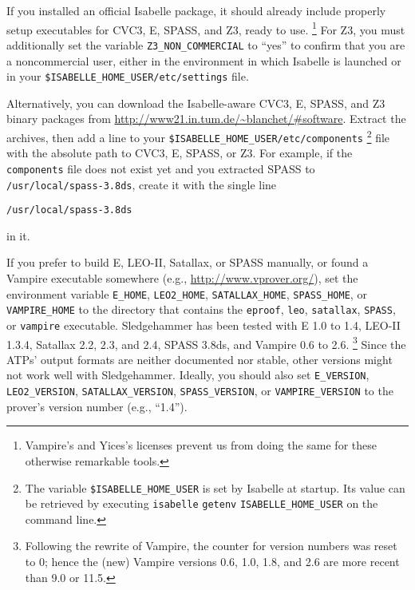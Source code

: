 \documentclass[a4paper,12pt]{article}
\newcommand\download{\url{http://www21.in.tum.de/~blanchet/\#software}}
\begin{document}
\begin{sloppy}
\begin{enum}
\item[\labelitemi] If you installed an official Isabelle package, it should
already include properly setup executables for CVC3, E, SPASS, and Z3, ready to use.%
\footnote{Vampire's and Yices's licenses prevent us from doing the same for
these otherwise remarkable tools.}
For Z3, you must additionally set the variable
\texttt{Z3\_NON\_COMMERCIAL} to ``yes'' to confirm that you are a
noncommercial user, either in the environment in which Isabelle is
launched or in your
\texttt{\$ISABELLE\_HOME\_USER/etc/settings} file.

\item[\labelitemi] Alternatively, you can download the Isabelle-aware CVC3, E,
SPASS, and Z3 binary packages from \download. Extract the archives, then add a
line to your \texttt{\$ISABELLE\_HOME\_USER\slash etc\slash components}%
\footnote{The variable \texttt{\$ISABELLE\_HOME\_USER} is set by Isabelle at
startup. Its value can be retrieved by executing \texttt{isabelle}
\texttt{getenv} \texttt{ISABELLE\_HOME\_USER} on the command line.}
file with the absolute path to CVC3, E, SPASS, or Z3. For example, if the
\texttt{components} file does not exist yet and you extracted SPASS to
\texttt{/usr/local/spass-3.8ds}, create it with the single line

\prew
\texttt{/usr/local/spass-3.8ds}
\postw

in it.

\item[\labelitemi] If you prefer to build E, LEO-II, Satallax, or SPASS
manually, or found a Vampire executable somewhere (e.g.,
\url{http://www.vprover.org/}), set the environment variable \texttt{E\_HOME},
\texttt{LEO2\_HOME}, \texttt{SATALLAX\_HOME}, \texttt{SPASS\_HOME}, or
\texttt{VAMPIRE\_HOME} to the directory that contains the \texttt{eproof},
\texttt{leo}, \texttt{satallax}, \texttt{SPASS}, or \texttt{vampire} executable.
Sledgehammer has been tested with E 1.0 to 1.4, LEO-II 1.3.4, Satallax 2.2, 2.3,
and 2.4, SPASS 3.8ds, and Vampire 0.6 to 2.6.%
\footnote{Following the rewrite of Vampire, the counter for version numbers was
reset to 0; hence the (new) Vampire versions 0.6, 1.0, 1.8, and 2.6 are more
recent than 9.0 or 11.5.}%
Since the ATPs' output formats are neither documented nor stable, other
versions might not work well with Sledgehammer. Ideally,
you should also set \texttt{E\_VERSION}, \texttt{LEO2\_VERSION},
\texttt{SATALLAX\_VERSION}, \texttt{SPASS\_VERSION}, or
\texttt{VAMPIRE\_VERSION} to the prover's version number (e.g., ``1.4'').


\end{enum}
\end{sloppy}
\end{document}
